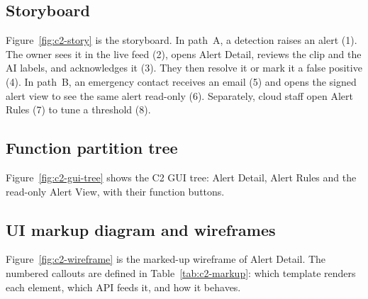 \subsection{Storyboard}
Figure~\ref{fig:c2-story} is the storyboard. In path~A, a detection raises an alert (1). The owner sees it in the live
feed (2), opens Alert Detail, reviews the clip and the AI labels, and acknowledges it (3). They then resolve it or
mark it a false positive (4). In path~B, an emergency contact receives an email (5) and opens the signed alert view
to see the same alert read-only (6). Separately, cloud staff open Alert Rules (7) to tune a threshold (8).


\subsection{Function partition tree}
Figure~\ref{fig:c2-gui-tree} shows the C2 GUI tree: Alert Detail, Alert Rules and the read-only
Alert View, with their function buttons.


\subsection{UI markup diagram and wireframes}
Figure~\ref{fig:c2-wireframe} is the marked-up wireframe of Alert Detail. The numbered callouts are defined in
Table~\ref{tab:c2-markup}: which template renders each element, which API feeds it, and how it behaves.



